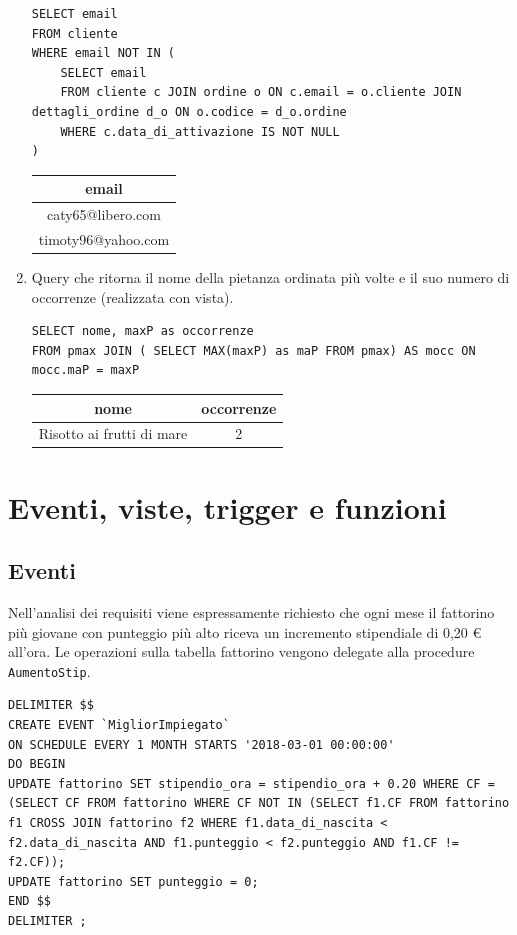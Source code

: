 \documentclass[10pt]{article}
\begin{document}
\begin{enumerate}[noitemsep]
\begin{lstlisting}[style=Mysql]
SELECT email 
FROM cliente 
WHERE email NOT IN (
	SELECT email 
	FROM cliente c JOIN ordine o ON c.email = o.cliente JOIN dettagli_ordine d_o ON o.codice = d_o.ordine 
	WHERE c.data_di_attivazione IS NOT NULL
)	\end{lstlisting}	
	\begin{table}[H]
		\centering
		\label{table:query5}
		\begin{tabular}{|c|}
			\hline
			\textbf{email} \\ \hline
			caty65@libero.com          \\ \hline
			timoty96@yahoo.com          \\	\hline
		\end{tabular}
	\end{table}
	\item Query che ritorna il nome della pietanza ordinata più volte e il suo numero di occorrenze (realizzata con vista).
	\begin{lstlisting}[style=Mysql]
SELECT nome, maxP as occorrenze
FROM pmax JOIN ( SELECT MAX(maxP) as maP FROM pmax) AS mocc ON mocc.maP = maxP \end{lstlisting}	
	\begin{table}[ht]
	\centering
		\label{table:query4}
		\begin{tabular}{|c|c|}
			\hline
			\multirow{1}{*}{\textbf{nome}} & \multicolumn{1}{c|}{\textbf{occorrenze}}\\
			\hline
			Risotto ai frutti di mare & 2\\ 
			\hline
			\end{tabular}
	\end{table}
	\end{enumerate}
		\pagebreak
		\section{Eventi, viste, trigger e funzioni}
		\subsection{Eventi}
		Nell'analisi dei requisiti viene espressamente richiesto che ogni mese il fattorino pi\`u giovane con punteggio pi\`u alto riceva un incremento stipendiale di 0,20 \euro{} all'ora.
		Le operazioni sulla tabella fattorino vengono delegate alla procedure \texttt{AumentoStip}.
\begin{lstlisting}[style=Mysql]
DELIMITER $$
CREATE EVENT `MigliorImpiegato` 
ON SCHEDULE EVERY 1 MONTH STARTS '2018-03-01 00:00:00'
DO BEGIN 
UPDATE fattorino SET stipendio_ora = stipendio_ora + 0.20 WHERE CF = (SELECT CF FROM fattorino WHERE CF NOT IN (SELECT f1.CF FROM fattorino f1 CROSS JOIN fattorino f2 WHERE f1.data_di_nascita < f2.data_di_nascita AND f1.punteggio < f2.punteggio AND f1.CF != f2.CF));
UPDATE fattorino SET punteggio = 0;
END $$
DELIMITER ;
\end{lstlisting}
\end{document}
